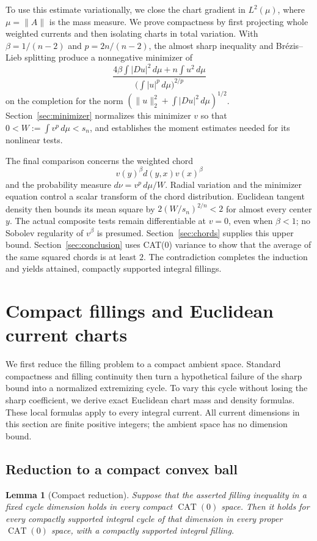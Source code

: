 \documentclass[11pt]{article}
\numberwithin{equation}{section}
\newtheorem{lemma}[theorem]{Lemma}
\theoremstyle{definition}
\theoremstyle{remark}
\begin{document}
To use this estimate variationally, we close the chart gradient in
$L^2(\mu)$, where $\mu=\|A\|$ is the mass measure. We prove compactness
by first projecting whole weighted currents and then isolating charts
in total variation. With $\beta=1/(n-2)$ and $p=2n/(n-2)$, the
almost sharp inequality and Br\'ezis--Lieb splitting
\cite{BrezisLieb1983} produce a nonnegative minimizer of
\[
 \frac{4\beta\int |Du|^2\,d\mu+n\int u^2\,d\mu}
 {\bigl(\int |u|^p\,d\mu\bigr)^{2/p}}
\]
on the completion for the norm
$(\|u\|_2^2+\int|Du|^2\,d\mu)^{1/2}$. Section~\ref{sec:minimizer} normalizes this
minimizer $v$ so that $0<W:=\int v^p\,d\mu<s_n$, and establishes
the moment estimates needed for its nonlinear tests.

The final comparison concerns the weighted chord
\[
 v(y)^\beta d(y,x)v(x)^\beta
\]
and the probability measure $d\nu=v^p\,d\mu/W$.
Radial variation and the minimizer equation control a scalar transform
of the chord distribution. Euclidean tangent density then bounds its
mean square by $2(W/s_n)^{2/n}<2$ for almost every center $y$.
The actual composite tests remain differentiable at $v=0$, even when
$\beta<1$; no Sobolev regularity of $v^\beta$ is presumed.
Section~\ref{sec:chords} supplies this upper bound.
Section~\ref{sec:conclusion} uses CAT(0) variance to show that the
average of the same squared chords is at least $2$. The contradiction
completes the induction and yields attained, compactly supported
integral fillings.

\section{Compact fillings and Euclidean current charts}
\label{sec:currents}

We first reduce the filling problem to a compact ambient space. Standard
compactness and filling continuity then turn a hypothetical failure of the
sharp bound into a normalized extremizing cycle. To vary this cycle
without losing the sharp coefficient, we derive exact Euclidean chart
mass and density formulas. These local formulas apply to every integral
current. All current dimensions in this section are finite positive
integers; the ambient space has no dimension bound.

\subsection{Reduction to a compact convex ball}

\begin{lemma}[Compact reduction]
\label{lem:compact-reduction}
Suppose that the asserted filling inequality in a fixed cycle dimension
holds in every compact \(\operatorname{CAT}(0)\) space. Then it holds for
every compactly supported integral cycle of that dimension in every proper
\(\operatorname{CAT}(0)\) space, with a compactly supported integral filling.
\end{lemma}
\end{document}
